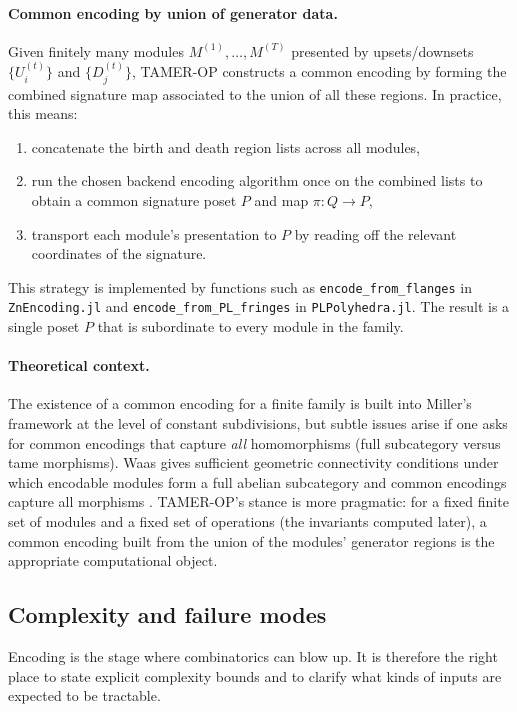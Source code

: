 \documentclass{article}
\newcommand{\<}{\langle}
\renewcommand{\>}{\rangle}
\theoremstyle{definition}
\theoremstyle{remark}
\begin{document}
	\paragraph{Common encoding by union of generator data.}
	Given finitely many modules $M^{(1)},\dots,M^{(T)}$ presented by upsets/downsets
	$\{U_i^{(t)}\}$ and $\{D_j^{(t)}\}$, TAMER-OP constructs a common encoding by forming
	the combined signature map associated to the union of all these regions.  In practice,
	this means:
	\begin{enumerate}[label=(\roman*)]
		\item concatenate the birth and death region lists across all modules,
		\item run the chosen backend encoding algorithm once on the combined lists to obtain
		a common signature poset $P$ and map $\pi\colon Q\to P$,
		\item transport each module's presentation to $P$ by reading off the relevant
		coordinates of the signature.
	\end{enumerate}
	This strategy is implemented by functions such as \texttt{encode\_from\_flanges} in
	\texttt{ZnEncoding.jl} and \texttt{encode\_from\_PL\_fringes} in \texttt{PLPolyhedra.jl}.
	The result is a single poset $P$ that is subordinate to every module in the family.
	
	\paragraph{Theoretical context.}
	The existence of a common encoding for a finite family is built into Miller's
	framework at the level of constant subdivisions, but subtle issues arise if one
	asks for common encodings that capture \emph{all} homomorphisms (full subcategory
	versus tame morphisms).  Waas gives sufficient geometric connectivity conditions
	under which encodable modules form a full abelian subcategory and common encodings
	capture all morphisms \cite{Waa24}.  TAMER-OP's stance is more pragmatic: for a fixed
	finite set of modules and a fixed set of operations (the invariants computed later),
	a common encoding built from the union of the modules' generator regions is the
	appropriate computational object.
	
	\subsection{Complexity and failure modes}
	\label{subsec:encoding-complexity}
	
	Encoding is the stage where combinatorics can blow up.  It is therefore the right
	place to state explicit complexity bounds and to clarify what kinds of inputs are
	expected to be tractable.
	
\end{document}

